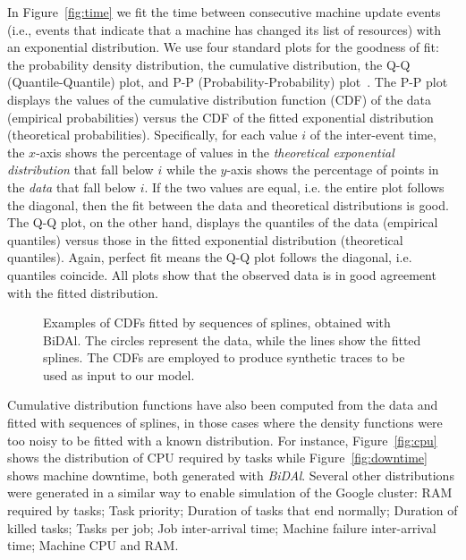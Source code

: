 \documentclass{article}
\begin{document}
In Figure~\ref{fig:time} we fit the time between consecutive machine update events (i.e., events that indicate that a machine has changed its list of resources) with an exponential distribution.  We use four standard plots for the goodness of fit: the probability density distribution, the cumulative distribution, the Q-Q (Quantile-Quantile) plot, and P-P (Probability-Probability) plot~\cite{gibbons2011}. The P-P plot displays the values of the cumulative distribution function (CDF) of the data (empirical probabilities) versus the CDF of the fitted exponential distribution (theoretical probabilities). Specifically, for each value $i$ of the inter-event time, the $x$-axis shows the percentage of values in the \emph{theoretical exponential distribution} that fall below $i$ while the $y$-axis shows the percentage of points in the \emph{data} that fall below $i$. If the two values are equal, i.e. the entire plot follows the diagonal, then the fit between the data and theoretical distributions is good. The Q-Q plot, on the other hand, displays the quantiles of the data (empirical quantiles) versus those in the fitted exponential distribution (theoretical quantiles). Again, perfect fit means the Q-Q plot follows the diagonal, i.e. quantiles coincide. All plots show that the observed data is in good agreement with the fitted distribution. 


\begin{figure}
\centering
{}
 \qquad
\caption{Examples of CDFs fitted by sequences of splines, obtained with BiDAl. The circles represent the data, while the lines show the fitted splines. The CDFs are employed to produce synthetic traces to be used as input to our model.}      
\end{figure}

Cumulative distribution functions have also been computed from the data and fitted with sequences of splines, in those cases where the density functions were too noisy to be fitted with a known distribution. For instance, Figure~\ref{fig:cpu} shows the distribution of CPU required by tasks while Figure~\ref{fig:downtime} shows machine downtime, both generated with \emph{BiDAl}. Several other distributions were generated in a similar way to enable simulation of the Google cluster: RAM required by tasks; Task priority; Duration of tasks that end normally; Duration of killed tasks; Tasks per job; Job inter-arrival time; Machine failure inter-arrival time; Machine CPU and RAM.
\end{document}
